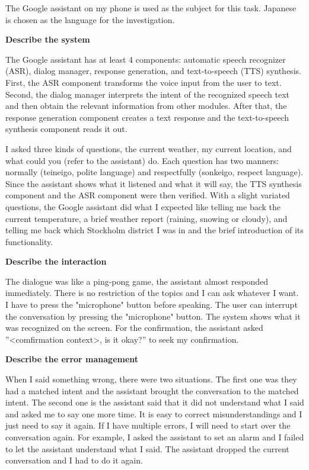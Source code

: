 \documentclass[12pt]{article}
\newenvironment{problem}[2][Problem]{\begin{trivlist}
\item[\hskip \labelsep {\bfseries #1}\hskip \labelsep {\bfseries #2.}]}{\end{trivlist}}
\begin{document}
\begin{problem}{3.3}
    The Google assistant on my phone is used as the subject for this task.
    Japanese is chosen as the language for the investigation.

    \textbf{Describe the system}

    The Google assistant has at least 4 components: automatic speech recognizer 
    (ASR), dialog manager, response generation, and text-to-speech (TTS) synthesis. 
    First, the ASR component transforms the voice input from the user to text. 
    Second, the dialog manager interprets the intent of the recognized speech 
    text and then obtain the relevant information from other modules. 
    After that, the response generation component creates a text response and 
    the text-to-speech synthesis component reads it out.

    I asked three kinds of questions, the current weather, my current location, 
    and what could you (refer to the assistant) do. 
    Each question has two manners: normally (teineigo, polite language) and 
    respectfully (sonkeigo, respect language). 
    Since the assistant shows what it listened and what it will say, 
    the TTS synthesis component and the ASR component were then verified. 
    With a slight variated questions, the Google assistant did what I expected 
    like telling me back the current temperature, 
    a brief weather report (raining, snowing or cloudy), and telling me back 
    which Stockholm district I was in and the brief introduction of its functionality.

    \textbf{Describe the interaction}

    The dialogue was like a ping-pong game, the assistant almost responded immediately.
    There is no restriction of the topics and I can ask whatever I want. 
    I have to press the "microphone" button before speaking. 
    The user can interrupt the conversation by pressing the "microphone" button.
    The system shows what it was recognized on the screen. 
    For the confirmation, the assistant asked ”<comfirmation context>, is it okay?” 
    to seek my confirmation.

    \textbf{Describe the error management}

    When I said something wrong, there were two situations. 
    The first one was they had a matched intent and the assistant brought 
    the conversation to the matched intent. 
    The second one is the assistant said that it did not understand what I said 
    and asked me to say one more time. 
    It is easy to correct misunderstandings and I just need to say it again.
    If I have multiple errors, I will need to start over the conversation again.
    For example, I asked the assistant to set an alarm and I failed to let the 
    assistant understand what I said. 
    The assistant dropped the current conversation and I had to do it again.


\end{problem}
\end{document}
